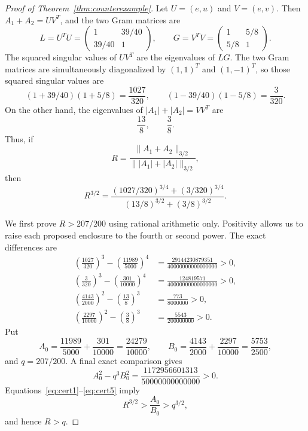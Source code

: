 \documentclass[11pt,reqno]{amsart}
\theoremstyle{remark}
\begin{document}
\begin{proof}[Proof of Theorem~\ref{thm:counterexample}]
Let \(U=(e,u)\) and \(V=(e,v)\).  Then \(A_1+A_2=UV^T\), and the two
Gram matrices are
\[
 L=U^TU=
 \begin{pmatrix}1&39/40\\39/40&1\end{pmatrix},
 \qquad
 G=V^TV=
 \begin{pmatrix}1&5/8\\5/8&1\end{pmatrix}.
\]
The squared singular values of \(UV^T\) are the eigenvalues of \(LG\).
The two Gram matrices are simultaneously diagonalized by
\((1,1)^T\) and \((1,-1)^T\), so those squared singular values are
\begin{equation}\label{eq:counterexample-sv}
 (1+39/40)(1+5/8)=\frac{1027}{320},
 \qquad
 (1-39/40)(1-5/8)=\frac3{320}.
\end{equation}
On the other hand, the eigenvalues of
\(|A_1|+|A_2|=VV^T\) are
\begin{equation}\label{eq:counterexample-den-eigs}
 \frac{13}{8},\qquad \frac38.
\end{equation}
Thus, if
\[
 R=\frac{\|A_1+A_2\|_{3/2}}
         {\||A_1|+|A_2|\|_{3/2}},
\]
then
\begin{equation}\label{eq:Rpower}
 R^{3/2}=
 \frac{(1027/320)^{3/4}+(3/320)^{3/4}}
      {(13/8)^{3/2}+(3/8)^{3/2}}.
\end{equation}

We first prove \(R>207/200\) using rational arithmetic only.  Positivity
allows us to raise each proposed enclosure to the fourth or second power.
The exact differences are
\begin{align}
 \left(\frac{1027}{320}\right)^3
 -\left(\frac{11989}{5000}\right)^4
 &=\frac{29144230879351}{40000000000000000}>0,\label{eq:cert1}\\
 \left(\frac3{320}\right)^3
 -\left(\frac{301}{10000}\right)^4
 &=\frac{124819571}{40000000000000000}>0,\label{eq:cert2}\\
 \left(\frac{4143}{2000}\right)^2
 -\left(\frac{13}{8}\right)^3
 &=\frac{773}{8000000}>0,\label{eq:cert3}\\
 \left(\frac{2297}{10000}\right)^2
 -\left(\frac38\right)^3
 &=\frac{5543}{200000000}>0.\label{eq:cert4}
\end{align}
Put
\[
 A_0=\frac{11989}{5000}+\frac{301}{10000}
 =\frac{24279}{10000},\qquad
 B_0=\frac{4143}{2000}+\frac{2297}{10000}
 =\frac{5753}{2500},
\]
and \(q=207/200\).  A final exact comparison gives
\begin{equation}\label{eq:cert5}
 A_0^2-q^3B_0^2
 =\frac{1172956601313}{50000000000000}>0.
\end{equation}
Equations~\eqref{eq:cert1}--\eqref{eq:cert5} imply
\[
 R^{3/2}>\frac{A_0}{B_0}>q^{3/2},
\]
and hence \(R>q\).


\end{proof}
\end{document}
